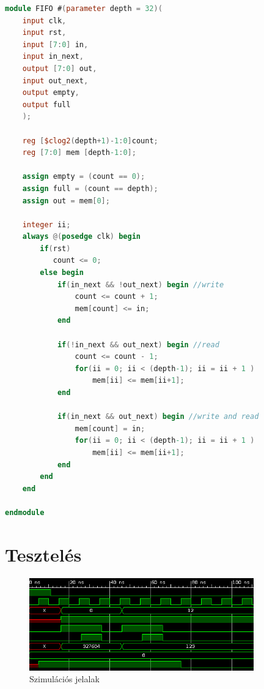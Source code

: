 \begin{lstlisting}[frame=single,language=verilog,caption={FIFO verilog modul},captionpos=b,label={lst:fifo}]
module FIFO #(parameter depth = 32)(
    input clk,
    input rst,
    input [7:0] in,
    input in_next,
    output [7:0] out,
    input out_next,
    output empty,
    output full
    );
    
    reg [$clog2(depth+1)-1:0]count;
    reg [7:0] mem [depth-1:0];
    
    assign empty = (count == 0);
    assign full = (count == depth);
    assign out = mem[0];
    
    integer ii;
    always @(posedge clk) begin
        if(rst)
           count <= 0;
        else begin            
            if(in_next && !out_next) begin //write
                count <= count + 1;
                mem[count] <= in;
            end
            
            if(!in_next && out_next) begin //read
                count <= count - 1;
                for(ii = 0; ii < (depth-1); ii = ii + 1 )
                    mem[ii] <= mem[ii+1];
            end
            
            if(in_next && out_next) begin //write and read
                mem[count] = in;                
                for(ii = 0; ii < (depth-1); ii = ii + 1 )
                    mem[ii] <= mem[ii+1];
            end
        end
    end
    
endmodule
\end{lstlisting}
\section{Tesztelés}
\begin{figure}[h]
\begin{center}
\includegraphics[height=4cm]{figures/test.png}
\caption{Szimulációs jelalak}
\label{fig:Testsim}
\end{center}
\end{figure}


